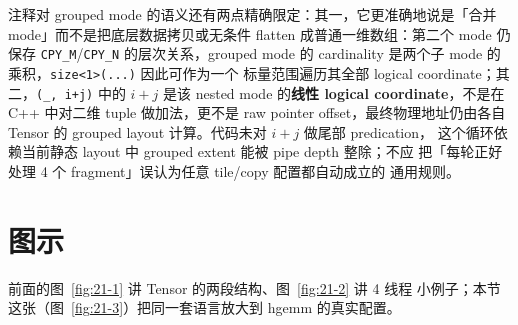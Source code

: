注释对 grouped mode 的语义还有两点精确限定：其一，它更准确地说是「合并
mode」而不是把底层数据拷贝或无条件 flatten 成普通一维数组：第二个 mode
仍保存 \texttt{CPY\_M}/\texttt{CPY\_N} 的层次关系，grouped mode 的
cardinality 是两个子 mode 的乘积，\texttt{size<1>(...)} 因此可作为一个
标量范围遍历其全部 logical coordinate；其二，\texttt{(\_, i+j)} 中的
$i{+}j$ 是该 nested mode 的\textbf{线性 logical coordinate}，不是在 C++
中对二维 tuple 做加法，更不是 raw pointer offset，最终物理地址仍由各自
Tensor 的 grouped layout 计算。代码未对 $i{+}j$ 做尾部 predication，
这个循环依赖当前静态 layout 中 grouped extent 能被 pipe depth 整除；不应
把「每轮正好处理 4 个 fragment」误认为任意 tile/copy 配置都自动成立的
通用规则。

\needspace{106mm}

\section{图示}

前面的图~\ref{fig:21-1} 讲 Tensor 的两段结构、图~\ref{fig:21-2} 讲 4 线程
小例子；本节这张（图~\ref{fig:21-3}）把同一套语言放大到 hgemm 的真实配置。


